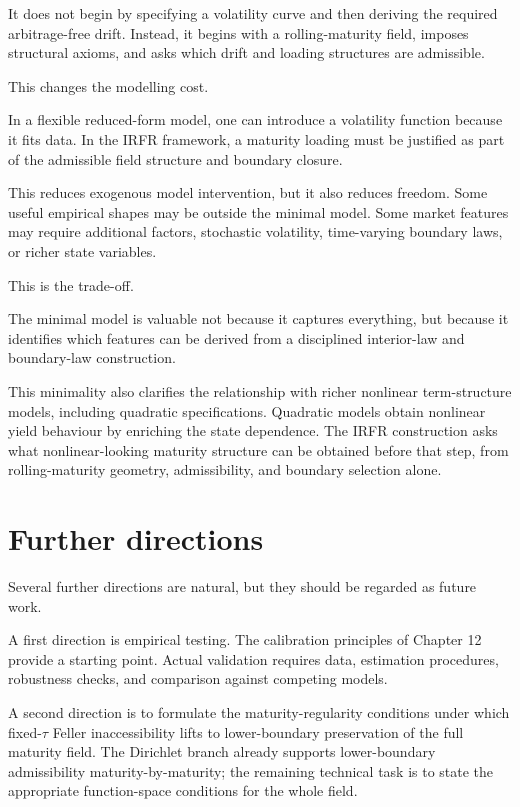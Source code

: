 \documentclass[11pt,oneside]{book}
\begin{document}
It does not begin by specifying a volatility curve and then deriving the
required arbitrage-free drift. Instead, it begins with a
rolling-maturity field, imposes structural axioms, and asks which drift
and loading structures are admissible.

This changes the modelling cost.

In a flexible reduced-form model, one can introduce a volatility
function because it fits data. In the IRFR framework, a maturity loading
must be justified as part of the admissible field structure and boundary
closure.

This reduces exogenous model intervention, but it also reduces freedom.
Some useful empirical shapes may be outside the minimal model. Some
market features may require additional factors, stochastic volatility,
time-varying boundary laws, or richer state variables.

This is the trade-off.

The minimal model is valuable not because it captures everything, but
because it identifies which features can be derived from a disciplined
interior-law and boundary-law construction.

This minimality also clarifies the relationship with richer nonlinear
term-structure models, including quadratic specifications. Quadratic
models obtain nonlinear yield behaviour by enriching the state
dependence. The IRFR construction asks what nonlinear-looking maturity
structure can be obtained before that step, from rolling-maturity
geometry, admissibility, and boundary selection alone.

\section{Further directions}\label{further-directions}

Several further directions are natural, but they should be regarded as
future work.

A first direction is empirical testing. The calibration principles of
Chapter 12 provide a starting point. Actual validation requires data,
estimation procedures, robustness checks, and comparison against
competing models.

A second direction is to formulate the maturity-regularity conditions
under which fixed-$\tau$ Feller inaccessibility lifts to lower-boundary
preservation of the full maturity field. The Dirichlet branch already
supports lower-boundary admissibility maturity-by-maturity; the
remaining technical task is to state the appropriate function-space
conditions for the whole field.
\end{document}
